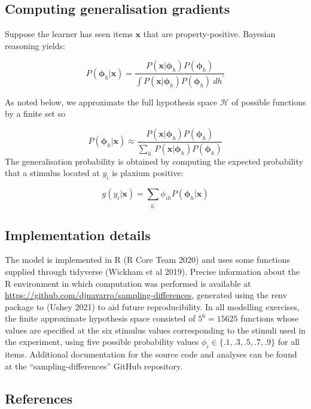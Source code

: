 \documentclass[
  english,
  doc]{apa6}
\begin{document}
\hypertarget{computing-generalisation-gradients}{%
\subsection{Computing generalisation gradients}\label{computing-generalisation-gradients}}

\noindent
Suppose the learner has seen items \(\bm x\) that are property-positive. Bayesian reasoning yields:

\[ 
P({\bm \phi}_h | \bm x) = \frac{P(\bm x | \bm{\phi}_h) P(\bm{\phi}_h)}{\int P(\bm x | \bm{\phi}_h) P(\bm{\phi}_h) \ dh^\prime}
\]

\noindent
As noted below, we approximate the full hypothesis space \(\mathcal{H}\) of possible functions by a finite set so

\[ 
P({\bm \phi}_h | \bm x) \approx \frac{P(\bm x | \bm{\phi}_h) P(\bm{\phi}_h)}{\sum_{h^\prime} P(\bm x | \bm{\phi}_h) P(\bm{\phi}_h)}
\]
The generalisation probability is obtained by computing the expected probability that a stimulus located at \(y_i\) is plaxium positive:

\[
g(y_i | \bm{x}) = \sum_{h^\prime} \phi_{ih} P({\bm \phi}_h | \bm x)
\]

\hypertarget{implementation-details}{%
\subsection{Implementation details}\label{implementation-details}}

The model is implemented in R (R Core Team 2020) and uses some functions supplied through tidyverse (Wickham et al 2019). Precise information about the R environment in which computation was performed is available at \url{https://github.com/djnavarro/sampling-differences}, generated using the renv package to (Ushey 2021) to aid future reproducibility. In all modelling exercises, the finite approximate hypothesis space consisted of \(5^6 = 15625\) functions whose values are specified at the six stimulus values corresponding to the stimuli used in the experiment, using five possible probability values \(\phi_i \in \{.1, .3, .5, .7, .9\}\) for all items. Additional documentation for the source code and analyses can be found at the \enquote{sampling-differences} GitHub repository.

\hypertarget{references}{%
\subsection{References}\label{references}}
\end{document}
